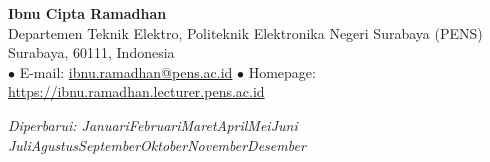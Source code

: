 \begin{center}
  {\LARGE\bfseries Ibnu Cipta Ramadhan}\\[4pt]
  Departemen Teknik Elektro, Politeknik Elektronika Negeri Surabaya (PENS)\\[2pt]
  Surabaya, 60111, Indonesia\\[2pt]
  \small
  \quad$\bullet$\quad
  E-mail: \href{mailto:ibnu.ramadhan@pens.ac.id}{ibnu.ramadhan@pens.ac.id}
  \quad$\bullet$\quad
  Homepage: \href{https://ibnu.ramadhan.lecturer.pens.ac.id}{https://ibnu.ramadhan.lecturer.pens.ac.id}
  \\[12pt]
\end{center}

\vspace{2pt}
\noindent\textit{Diperbarui: \number\day\space
  \ifcase\month\or Januari\or Februari\or Maret\or April\or Mei\or Juni\or
  Juli\or Agustus\or September\or Oktober\or November\or Desember\fi\space\number\year}
